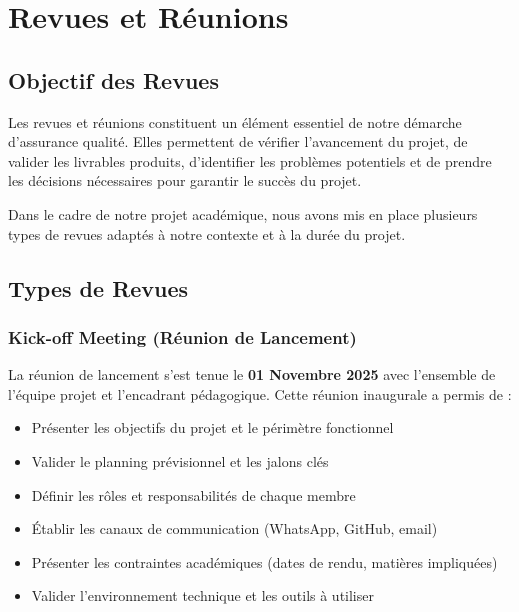 \documentclass[12pt,a4paper]{report}
\begin{document}
\newpage

\chapter{Revues et Réunions}

\section{Objectif des Revues}

Les revues et réunions constituent un élément essentiel de notre démarche d'assurance qualité. Elles permettent de vérifier l'avancement du projet, de valider les livrables produits, d'identifier les problèmes potentiels et de prendre les décisions nécessaires pour garantir le succès du projet.

Dans le cadre de notre projet académique, nous avons mis en place plusieurs types de revues adaptés à notre contexte et à la durée du projet.

\section{Types de Revues}

\subsection{Kick-off Meeting (Réunion de Lancement)}

La réunion de lancement s'est tenue le \textbf{01 Novembre 2025} avec l'ensemble de l'équipe projet et l'encadrant pédagogique. Cette réunion inaugurale a permis de :

\begin{itemize}
    \item Présenter les objectifs du projet et le périmètre fonctionnel
    \item Valider le planning prévisionnel et les jalons clés
    \item Définir les rôles et responsabilités de chaque membre
    \item Établir les canaux de communication (WhatsApp, GitHub, email)
    \item Présenter les contraintes académiques (dates de rendu, matières impliquées)
    \item Valider l'environnement technique et les outils à utiliser
\end{itemize}
\end{document}
